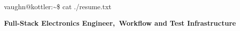\documentclass[../main.tex]{subfiles}
\begin{document}
\begin{center}\Huge
    {\color{terminal}vaughn@kottler}:{\color{pri-900}\textasciitilde{}}\$
    cat ./resume.txt
\end{center}
\begin{center}\large
    \color{pri-900}\textbf{
        Full-Stack Electronics Engineer,\
        Workflow and Test Infrastructure
    }
\end{center}
\end{document}
